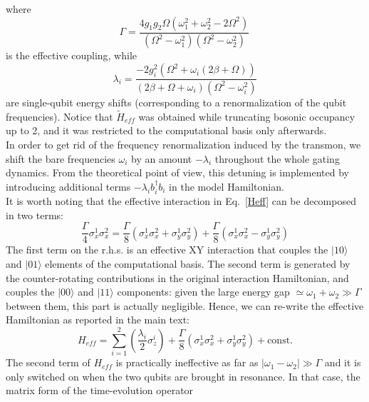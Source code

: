 \documentclass[aps,twocolumn,groupedaddress,superscriptaddress,floatfix,amsmath,amssymb,prb]{revtex4-1}
\begin{document}
where
\begin{equation}
\Gamma = \frac{4 g_1 g_2 \Omega(\omega_1^2 + \omega_2^2 -2\Omega^2)}{(\Omega^2 - \omega_1^2)(\Omega^2 - \omega_2^2)} \, 
\end{equation}
is the effective coupling, while
\begin{equation}
\lambda_i =  \frac{-2g_i^2(\Omega^2+\omega_i(2\beta + \Omega))}{     (2\beta+\Omega+\omega_i)(\Omega^2 - \omega_i^2)}
\end{equation}
are single-qubit energy shifts (corresponding to a renormalization of the qubit frequencies). 
Notice that $\tilde{H}_{eff}$ was obtained while truncating bosonic occupancy up to 2, and it was restricted to the computational basis only afterwards.\\
In order to get rid of the frequency renormalization induced by the transmon, 
we shift the bare frequencies $\omega_i$ by an amount $-\lambda_i$ throughout the whole gating dynamics. From the theoretical point of view, this detuning is implemented by introducing  additional terms $-\lambda_i b_i^\dagger b_i$ in the model Hamiltonian.\\
It is worth noting that the effective interaction in Eq.~\eqref{Heff} can be decomposed in two terms:
\begin{equation}
\frac{\Gamma}{4} \sigma^1_x\sigma^2_x = \frac{\Gamma}{8} \left(\sigma^1_x\sigma^2_x + \sigma^1_y\sigma^2_y\right) + \frac{\Gamma}{8} \left(\sigma^1_x\sigma^2_x - \sigma^1_y\sigma^2_y\right)
\end{equation}
The first term on the r.h.s. is an effective XY interaction that couples the $|10\rangle$ and $|01\rangle$ elements of the computational basis. The second term is generated by the counter-rotating contributions in the original interaction Hamiltonian, and couples the $|00\rangle$ and $|11\rangle$ components: given the large energy gap $ \simeq \omega_1 + \omega_2 \gg \Gamma$ between them, this part is actually negligible. Hence, we can re-write the effective Hamiltonian as reported in the main text:
\begin{equation}
H_{eff} = \sum_{i=1}^2 \left(\frac{\lambda_i}{2}\sigma^i_{z}\right) + \frac{\Gamma}{8} \left( \sigma^1_x\sigma^2_x +\sigma^1_y\sigma^2_y \right) + \text{const.}
\label{eq:Heff}
\end{equation}
The second term of $H_{eff}$ is practically ineffective as far as $|\omega_1-\omega_2| \gg \Gamma$ and it is only switched on when the two qubits are brought in resonance. In that case, the matrix form of the time-evolution operator
\end{document}
